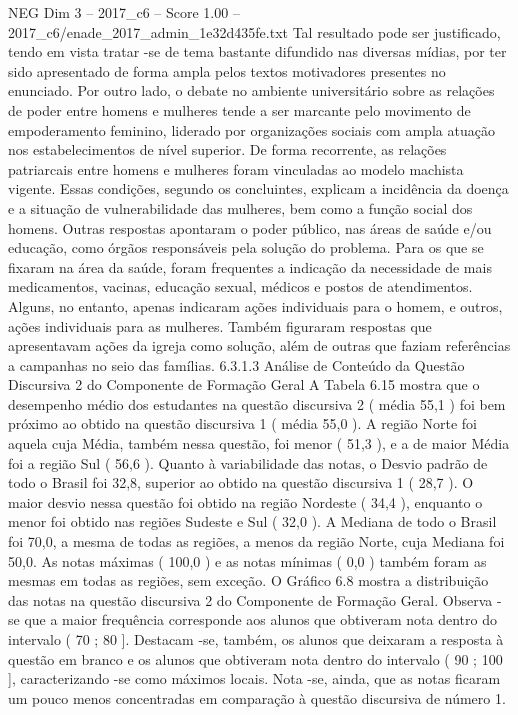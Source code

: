\begin{textsample}{NEG Dim 3 – 2017\_c6 – Score 1.00 – 2017\_c6/enade\_2017\_admin\_1e32d435fe.txt}
Tal resultado pode ser justificado, tendo em vista tratar -se de tema bastante difundido nas diversas mídias, por ter sido apresentado de forma ampla pelos textos motivadores presentes no enunciado.
Por outro lado, o debate no ambiente universitário sobre as relações de poder entre homens e mulheres tende a ser marcante pelo movimento de empoderamento feminino, liderado por organizações sociais com ampla atuação nos estabelecimentos de nível superior.
De forma recorrente, as relações patriarcais entre homens e mulheres foram vinculadas ao modelo machista vigente.
Essas condições, segundo os concluintes, explicam a incidência da doença e a situação de vulnerabilidade das mulheres, bem como a função social dos homens.
Outras respostas apontaram o poder público, nas áreas de saúde e/ou educação, como órgãos responsáveis pela solução do problema.
Para os que se fixaram na área da saúde, foram frequentes a indicação da necessidade de mais medicamentos, vacinas, educação sexual, médicos e postos de atendimentos.
Alguns, no entanto, apenas indicaram ações individuais para o homem, e outros, ações individuais para as mulheres.
Também figuraram respostas que apresentavam ações da igreja como solução, além de outras que faziam referências a campanhas no seio das famílias. 6.3.1.3 Análise de Conteúdo da Questão Discursiva 2 do Componente de Formação Geral A Tabela 6.15 mostra que o desempenho médio dos estudantes na questão discursiva 2 ( média 55,1 ) foi bem próximo ao obtido na questão discursiva 1 ( média 55,0 ).
A região Norte foi aquela cuja Média, também nessa questão, foi menor ( 51,3 ), e a de maior Média foi a região Sul ( 56,6 ).
Quanto à variabilidade das notas, o Desvio padrão de todo o Brasil foi 32,8, superior ao obtido na questão discursiva 1 ( 28,7 ).
O maior desvio nessa questão foi obtido na região Nordeste ( 34,4 ), enquanto o menor foi obtido nas regiões Sudeste e Sul ( 32,0 ).
A Mediana de todo o Brasil foi 70,0, a mesma de todas as regiões, a menos da região Norte, cuja Mediana foi 50,0.
As notas máximas ( 100,0 ) e as notas mínimas ( 0,0 ) também foram as mesmas em todas as regiões, sem exceção.
O Gráfico 6.8 mostra a distribuição das notas na questão discursiva 2 do Componente de Formação Geral.
Observa -se que a maior frequência corresponde aos alunos que obtiveram nota dentro do intervalo ( 70 ; 80 ].
Destacam -se, também, os alunos que deixaram a resposta à questão em branco e os alunos que obtiveram nota dentro do intervalo ( 90 ; 100 ], caracterizando -se como máximos locais.
Nota -se, ainda, que as notas ficaram um pouco menos concentradas em comparação à questão discursiva de número 1.

\end{textsample}
